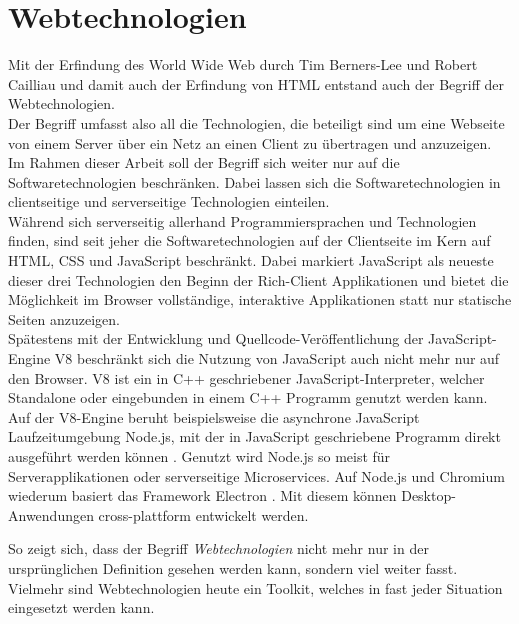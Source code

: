 \section{Webtechnologien}
\label{section:webtechnologien}

Mit der Erfindung des World Wide Web durch Tim Berners-Lee und Robert Cailliau und damit auch der Erfindung 
von HTML \cite{www} entstand auch der Begriff der Webtechnologien.\\
Der Begriff umfasst also all die Technologien, die beteiligt sind um eine Webseite von einem Server über ein 
Netz an einen Client zu übertragen und anzuzeigen.\\

Im Rahmen dieser Arbeit soll der Begriff sich weiter nur auf die Softwaretechnologien beschränken. Dabei lassen
sich die Softwaretechnologien in clientseitige und serverseitige Technologien einteilen.\\
Während sich serverseitig allerhand Programmiersprachen und Technologien finden, sind seit jeher die Softwaretechnologien
auf der Clientseite im Kern auf HTML, CSS und JavaScript beschränkt. Dabei markiert JavaScript als neueste dieser
drei Technologien \cite{jspress} den Beginn der Rich-Client Applikationen und bietet die Möglichkeit im Browser 
vollständige, interaktive Applikationen statt nur statische Seiten anzuzeigen.\\
Spätestens mit der Entwicklung und Quellcode-Veröffentlichung der JavaScript-Engine V8 \cite{v8} beschränkt sich die Nutzung
von JavaScript auch nicht mehr nur auf den Browser. V8 ist ein in C++ geschriebener JavaScript-Interpreter,
welcher Standalone oder eingebunden in einem C++ Programm genutzt werden kann.\\
Auf der V8-Engine beruht beispielsweise die asynchrone JavaScript Laufzeitumgebung Node.js, mit der in 
JavaScript geschriebene Programm direkt ausgeführt werden können \cite{node}. Genutzt wird Node.js so meist für Serverapplikationen
oder serverseitige Microservices.
Auf Node.js und Chromium wiederum basiert das Framework Electron \cite{electron}. Mit diesem können Desktop-Anwendungen
cross-plattform entwickelt werden.

So zeigt sich, dass der Begriff \emph{Webtechnologien} nicht mehr nur in der ursprünglichen Definition gesehen werden kann,
sondern viel weiter fasst. Vielmehr sind Webtechnologien heute ein Toolkit, welches in fast jeder Situation eingesetzt werden
kann. 


% 